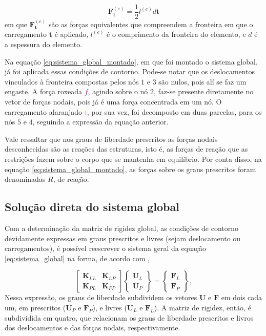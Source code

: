 \begin{equation}
    \bm{F}^{(e)}_{\bm{t}} = \frac{1}{2} l^{(e)} d \bm{t}
\end{equation}
em que $\bm{F}^{(e)}_{\bm{t}}$ são as forças equivalentes que compreendem a fronteira em que o carregamento $\bm{t}$ é aplicado, $l^{(e)}$ é o comprimento da fronteira do elemento, e $d$ é a espessura do elemento.

Na equação \ref{eq:sistema_global_montado}, em que foi montado o sistema global, já foi aplicada essas condições de contorno. Pode-se notar que os deslocamentos vinculados à fronteira compostas pelos nós $1$ e $3$ são nulos, pois alí se faz um engaste. A força roxeada \textcolor{purple}{$f$}, agindo sobre o nó $2$, faz-se presente diretamente no vetor de forças nodais, pois já é uma força concentrada em um nó. O carregamento alaranjado \textcolor{orange}{$t$}, por sua vez, foi decomposto em duas parcelas, para os nós $5$ e $4$, seguindo a expressão da equação anterior. 

Vale ressaltar que nos graus de liberdade prescritos as forças nodais desconhecidas são as reações das estruturas, isto é, as forças de reação que as restrições fazem sobre o corpo que se mantenha em equilíbrio. Por conta disso, na equação \ref{eq:sistema_global_montado}, as forças sobre os graus prescritos foram denominadas $R$, de reação.

\subsection{Solução direta do sistema global}

Com a determinação da matriz de rigidez global, as condições de contorno devidamente expressas em graus prescritos e livres (sejam deslocamento ou carregamentos), é possível reescrever o sistema geral da equação \ref{eq:sistema_global} na forma, de acordo com ,

\begin{equation}
    \begin{bmatrix}
        \bm{K}_{LL} & \bm{K}_{LP} \\
        \bm{K}_{PL} & \bm{K}_{PP}
    \end{bmatrix} 
    \begin{Bmatrix}
        \bm{U}_L \\ \bm{U}_P
    \end{Bmatrix}
    = \begin{Bmatrix}
        \bm{F}_L \\ \bm{F}_P
    \end{Bmatrix},
\end{equation}
Nessa expressão, os graus de liberdade subdividem os vetores $\bm{U}$ e $\bm{F}$ em dois cada um, em prescritos ($\bm{U}_P$ e $\bm{F}_P$), e livres ($\bm{U}_L$ e $\bm{F}_L$). A matriz de rigidez, então, é subdividida em quatro, que relacionam os graus de liberdade prescritos e livros dos deslocamentos e das forças nodais, respectivamente.

